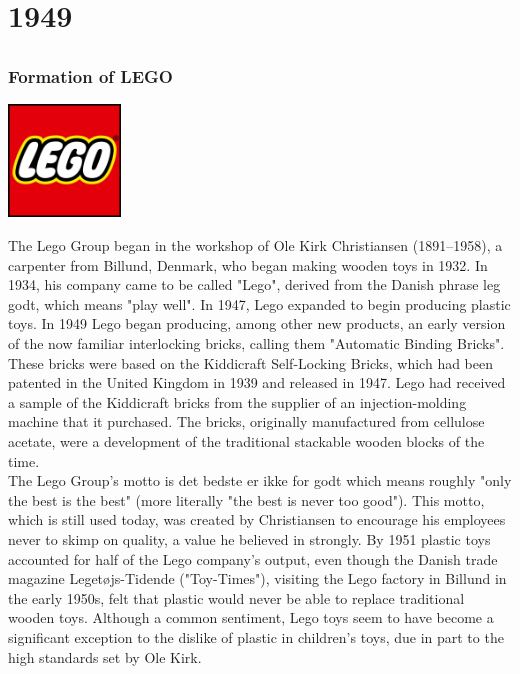 \documentclass[11pt]{report}
\begin{document}
\chapter{1949}
\section{}
\subsection{Formation of LEGO}
\vspace{2mm}\begin{center}\includegraphics[width=3cm]{./img/legoLogo.jpg}\end{center}
The Lego Group began in the workshop of Ole Kirk Christiansen (1891–1958), a carpenter from Billund, Denmark, who began making wooden toys in 1932. In 1934, his company came to be called "Lego", derived from the Danish phrase leg godt, which means "play well". In 1947, Lego expanded to begin producing plastic toys. In 1949 Lego began producing, among other new products, an early version of the now familiar interlocking bricks, calling them "Automatic Binding Bricks". These bricks were based on the Kiddicraft Self-Locking Bricks, which had been patented in the United Kingdom in 1939 and released in 1947. Lego had received a sample of the Kiddicraft bricks from the supplier of an injection-molding machine that it purchased. The bricks, originally manufactured from cellulose acetate, were a development of the traditional stackable wooden blocks of the time.\\
\indent The Lego Group's motto is det bedste er ikke for godt which means roughly "only the best is the best" (more literally "the best is never too good"). This motto, which is still used today, was created by Christiansen to encourage his employees never to skimp on quality, a value he believed in strongly. By 1951 plastic toys accounted for half of the Lego company's output, even though the Danish trade magazine Legetøjs-Tidende ("Toy-Times"), visiting the Lego factory in Billund in the early 1950s, felt that plastic would never be able to replace traditional wooden toys. Although a common sentiment, Lego toys seem to have become a significant exception to the dislike of plastic in children's toys, due in part to the high standards set by Ole Kirk.
\end{document}
